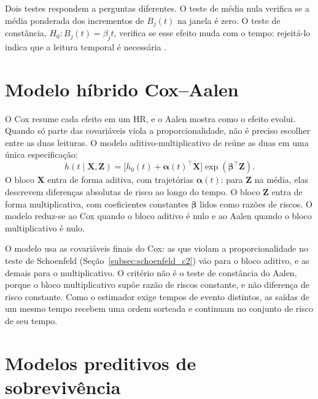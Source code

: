 Dois testes respondem a perguntas diferentes. O teste de média nula verifica se a média ponderada dos incrementos de $B_j(t)$ na janela é zero. O teste de constância, $H_0: B_j(t) = \beta_j t$, verifica se esse efeito muda com o tempo: rejeitá-lo indica que a leitura temporal é necessária \citep{martinussen2006}.

\section{Modelo híbrido Cox--Aalen}
\label{subsec:cox_aalen}

O Cox resume cada efeito em um HR, e o Aalen mostra como o efeito evolui. Quando só parte das covariáveis viola a proporcionalidade, não é preciso escolher entre as duas leituras. O modelo aditivo-multiplicativo de \citet{scheike2002} reúne as duas em uma única especificação:
\begin{equation}
    h(t \mid \mathbf{X}, \mathbf{Z})
    = \bigl[h_0(t) + \boldsymbol{\alpha}(t)^{\top} \mathbf{X}\bigr]
    \exp(\boldsymbol{\beta}^{\top} \mathbf{Z}).
    \label{eq:cox_aalen}
\end{equation}
O bloco $\mathbf{X}$ entra de forma aditiva, com trajetórias $\boldsymbol{\alpha}(t)$: para $\mathbf{Z}$ na média, elas descrevem diferenças absolutas de risco ao longo do tempo. O bloco $\mathbf{Z}$ entra de forma multiplicativa, com coeficientes constantes $\boldsymbol{\beta}$ lidos como razões de riscos. O modelo reduz-se ao Cox quando o bloco aditivo é nulo e ao Aalen quando o bloco multiplicativo é nulo.

O modelo usa as covariáveis finais do Cox: as que violam a proporcionalidade no teste de Schoenfeld (Seção~\ref{subsec:schoenfeld_c2}) vão para o bloco aditivo, e as demais para o multiplicativo. O critério não é o teste de constância do Aalen, porque o bloco multiplicativo supõe razão de riscos constante, e não diferença de risco constante. Como o estimador exige tempos de evento distintos, as saídas de um mesmo tempo recebem uma ordem sorteada \citep{schoenfeld1982,martinussen2006} e continuam no conjunto de risco de seu tempo.

\section{Modelos preditivos de sobrevivência}
\label{sec:modelos_preditivos}

